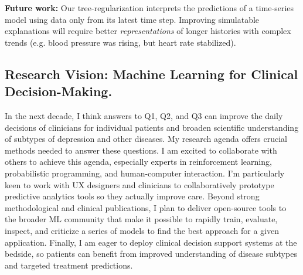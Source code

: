 \documentclass[11pt,letterpaper]{article}
\begin{document}
\textbf{Future work:} Our tree-regularization interprets the predictions of a time-series model using data only from its latest time step. Improving simulatable explanations will require better \emph{representations} of longer histories with complex trends (e.g. blood pressure was rising, but heart rate stabilized).%

\subsection*{Research Vision: Machine Learning for Clinical Decision-Making.}

In the next decade, I think answers to Q1, Q2, and Q3 can improve the daily decisions of clinicians for individual patients and broaden scientific understanding of subtypes of depression and other diseases.
My research agenda offers crucial methods needed to answer these questions.
I am excited to collaborate with others to achieve this agenda, especially experts in reinforcement learning,   probabilistic programming, and human-computer interaction.
I'm particularly keen to work 
with UX designers and clinicians to collaboratively prototype predictive analytics tools so they actually improve care.
Beyond strong methodological and clinical publications, 
I plan to deliver open-source tools to the broader ML community that make it possible to rapidly train, evaluate, inspect, and criticize a series of models to find the best approach for a given application. Finally, I am eager to deploy clinical decision support systems at the bedside, so patients can benefit from improved understanding of disease subtypes and targeted treatment predictions.



\renewcommand{\url}[1]
{\ifx#1\else\href{#1}{[PDF]}\fi}
{\scriptsize
\setlength{\bibsep}{1pt}

}
\end{document}
